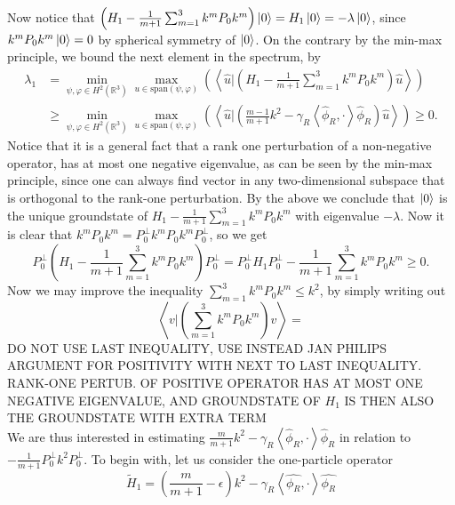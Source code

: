 \documentclass[a4paper,11pt]{article}
\newcommand{\Span}[1]{\text{span}\left(#1\right)}
\renewcommand{\braket}[1]{\left\langle#1\right\rangle}
\newcommand{\R}{\mathbb{R}}
\numberwithin{equation}{section}
\begin{document}
Now notice that $ \left(H_1-\frac{1}{m+1}\sum_{m=1}^{3}k^mP_0k^m\right)\ket{0}=H_1\ket{0}=-\lambda\ket{0} $, since $ k^mP_0k^m\ket{0}=0 $ by spherical symmetry of $ \ket{0} $. On the contrary by the min-max principle, we bound the next element in the spectrum, by \begin{equation}
\begin{aligned}
\lambda_1&=\min_{\psi,\varphi\in H^2(\R^3)}\max_{u\in\Span{\psi,\varphi}}\left(\braket{\hat{u}\Bigg|\left(H_1-\frac{1}{m+1}\sum_{m=1}^{3}k^mP_0k^m\right)\hat{u}}\right)\\
&\geq\min_{\psi,\varphi\in H^2(\R^3)}\max_{u\in\Span{\psi,\varphi}}\left(\braket{\hat{u}\Bigg|\left(\frac{m-1}{m+1}k^2-\gamma_R\braket{\hat{\phi}_R,\cdot}\hat{\phi}_R\right)\hat{u}}\right)\geq0.
\end{aligned}
\end{equation}
Notice that it is a general fact that a rank one perturbation of a non-negative operator, has at most one negative eigenvalue, as can be seen by the min-max principle, since one can always find vector in any two-dimensional subspace that is orthogonal to the rank-one perturbation.
By the above we conclude that $ \ket{0} $ is the unique groundstate of $ H_1-\frac{1}{m+1}\sum_{m=1}^{3}k^mP_0k^m $ with eigenvalue $ -\lambda $. Now it is clear that $ k^mP_0k^m=P_0^\perp k^mP_0k^mP_0^\perp $, so we get\begin{equation}
P_0^\perp \left(H_1-\frac{1}{m+1}\sum_{m=1}^{3}k^mP_0k^m\right)P_0^\perp=P_0^\perp H_1P_0^\perp-\frac{1}{m+1}\sum_{m=1}^{3}k^mP_0k^m\geq 0.
\end{equation}
Now we may improve the inequality $  \sum_{m=1}^{3}k^mP_0k^m\leq k^2 $, by simply writing out \begin{equation}
\braket{v|(\sum_{m=1}^{3}k^mP_0k^m)v}=
\end{equation}
DO NOT USE LAST INEQUALITY, USE INSTEAD JAN PHILIPS ARGUMENT FOR POSITIVITY WITH NEXT TO LAST INEQUALITY. RANK-ONE PERTUB. OF POSITIVE OPERATOR HAS AT MOST ONE NEGATIVE EIGENVALUE, AND GROUNDSTATE OF $ H_1 $ IS THEN ALSO THE GROUNDSTATE WITH EXTRA TERM\\
We are thus interested in estimating $ \frac{m}{m+1}k^2-\gamma_R\braket{\hat{\phi}_R,\cdot}\hat{\phi}_R $ in relation to $ -\frac{1}{m+1}P_0^\perp k^2P_0^\perp $.
To begin with, let us consider the one-particle operator \begin{equation}
\tilde{H}_1=\left(\frac{m}{m+1}-\epsilon\right)k^2-\gamma_R\braket{\hat{\phi_R},\cdot}\hat{\phi_R}
\end{equation}
\end{document}
